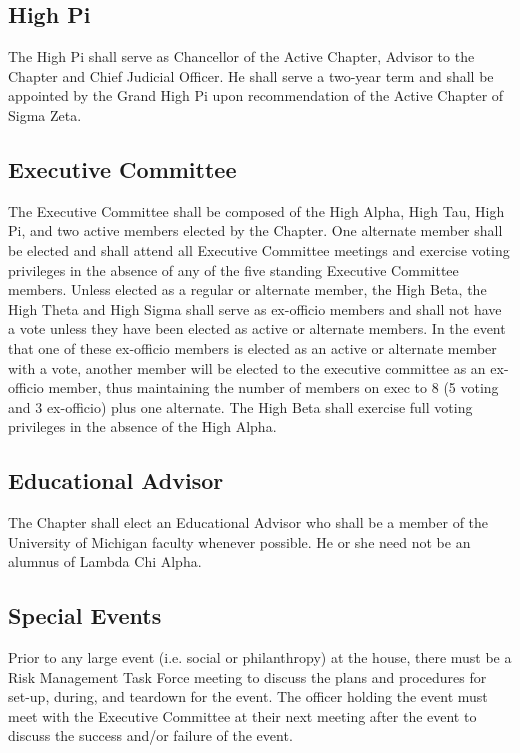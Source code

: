 \documentclass{article}
\begin{document}
\subsection{High Pi}

The High Pi shall serve as Chancellor of the Active Chapter, Advisor to the
Chapter and Chief Judicial Officer. He shall serve a two-year term and shall be
appointed by the Grand High Pi upon recommendation of the Active Chapter of
Sigma Zeta.

\subsection{Executive Committee}

The Executive Committee shall be composed of the High Alpha, High Tau, High Pi,
and two active members elected by the Chapter. One alternate member shall be
elected and shall attend all Executive Committee meetings and exercise voting
privileges in the absence of any of the five standing Executive Committee
members. Unless elected as a regular or alternate member, the High Beta, the
High Theta and High Sigma shall serve as ex-officio members and shall not have a
vote unless they have been elected as active or alternate members. In the event
that one of these ex-officio members is elected as an active or alternate member
with a vote, another member will be elected to the executive committee as an
ex-officio member, thus maintaining the number of members on exec to 8 (5 voting
and 3 ex-officio) plus one alternate. The High Beta shall exercise full voting
privileges in the absence of the High Alpha.

\subsection{Educational Advisor}

The Chapter shall elect an Educational Advisor who shall be a member of the
University of Michigan faculty whenever possible. He or she need not be an
alumnus of Lambda Chi Alpha.

\subsection{Special Events}

Prior to any large event (i.e. social or philanthropy) at the house, there must
be a Risk Management Task Force meeting to discuss the plans and procedures for
set-up, during, and teardown for the event. The officer holding the event must
meet with the Executive Committee at their next meeting after the event to
discuss the success and/or failure of the event.
\end{document}
